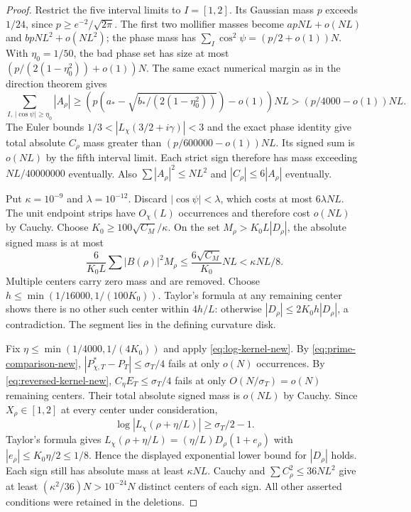 \begin{proof}
Restrict the five interval limits to $I=[1,2]$. Its Gaussian mass
$p$ exceeds $1/24$, since $p\ge e^{-2}/\sqrt{2\pi}$.
The first two mollifier masses become $apNL+o(NL)$ and
$bpNL^2+o(NL^2)$; the phase mass has
$\sum_I\cos^2\psi=(p/2+o(1))N$.
With $\eta_0=1/50$, the bad phase set has size at most
$(p/(2(1-\eta_0^2))+o(1))N$. The same exact numerical margin
as in the direction theorem gives
\[
 \sum_{I,\,|\cos\psi|\ge\eta_0}|A_\rho|
     \ge\left(p\left(a_*-\sqrt{b_*/(2(1-\eta_0^2))}\right)
                                                   -o(1)\right)NL
     >(p/4000-o(1))NL.
\]
The Euler bounds $1/3<|L_\chi(3/2+i\gamma)|<3$ and the exact
phase identity give total absolute $C_\rho$ mass greater than
$(p/600000-o(1))NL$. Its signed sum is $o(NL)$ by the fifth interval
limit. Each strict sign therefore has mass exceeding $NL/40000000$
eventually. Also $\sum|A_\rho|^2\le NL^2$ and
$|C_\rho|\le6|A_\rho|$ eventually.

Put $\kappa=10^{-9}$ and $\lambda=10^{-12}$.
Discard $|\cos\psi|<\lambda$, which costs at most $6\lambda NL$.
The unit endpoint strips have $O_\chi(L)$ occurrences and therefore
cost $o(NL)$ by Cauchy. Choose
$K_0\ge100\sqrt{C_M}/\kappa$. On the set
$M_\rho>K_0L|D_\rho|$, the absolute signed mass is at most
\[
 \frac6{K_0L}\sum |B(\rho)|^2M_\rho
 \le\frac{6\sqrt{C_M}}{K_0}NL<\kappa NL/8.
\]
Multiple centers carry zero mass and are removed. Choose
$h\le\min(1/16000,1/(100K_0))$.
Taylor's formula at any remaining center shows there is no other
such center within $4h/L$: otherwise
$|D_\rho|\le2K_0h|D_\rho|$, a contradiction. The segment lies in
the defining curvature disk.

Fix $\eta\le\min(1/4000,1/(4K_0))$ and apply
\eqref{eq:log-kernel-new}. By \eqref{eq:prime-comparison-new},
$|P^*_{\chi,T}-P_T|\le\sigma_T/4$ fails at only $o(N)$ occurrences.
By \eqref{eq:reversed-kernel-new},
$C_\eta E_T\le\sigma_T/4$ fails at only $O(N/\sigma_T)=o(N)$
remaining centers. Their total absolute signed mass is $o(NL)$ by
Cauchy. Since $X_\rho\in[1,2]$ at every center under consideration,
\[
          \log|L_\chi(\rho+\eta/L)|\ge\sigma_T/2-1.
\]
Taylor's formula gives
$L_\chi(\rho+\eta/L)=(\eta/L)D_\rho(1+e_\rho)$ with
$|e_\rho|\le K_0\eta/2\le1/8$. Hence the displayed exponential
lower bound for $|D_\rho|$ holds.
Each sign still has absolute mass at least $\kappa NL$.
Cauchy and $\sum C_\rho^2\le36NL^2$ give at least
$(\kappa^2/36)N>10^{-24}N$ distinct centers of each sign.
All other asserted conditions were retained in the deletions.
\end{proof}

